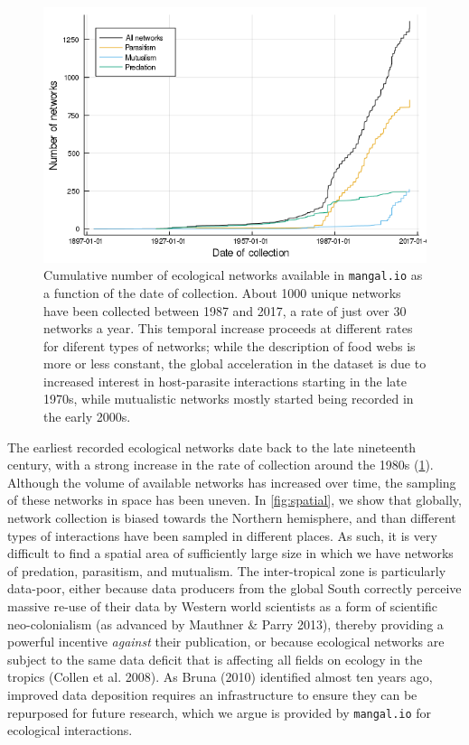 \begin{figure}
\hypertarget{fig:temporal}{%
\centering
\includegraphics{figures/figure_01_a.png}
\caption{Cumulative number of ecological networks available in
\texttt{mangal.io} as a function of the date of collection. About 1000
unique networks have been collected between 1987 and 2017, a rate of
just over 30 networks a year. This temporal increase proceeds at
different rates for diferent types of networks; while the description of
food webs is more or less constant, the global acceleration in the
dataset is due to increased interest in host-parasite interactions
starting in the late 1970s, while mutualistic networks mostly started
being recorded in the early 2000s.}\label{fig:temporal}
}
\end{figure}

The earliest recorded ecological networks date back to the late
nineteenth century, with a strong increase in the rate of collection
around the 1980s (\cref{fig:temporal}). Although the volume of available
networks has increased over time, the sampling of these networks in
space has been uneven. In \cref{fig:spatial}, we show that globally,
network collection is biased towards the Northern hemisphere, and than
different types of interactions have been sampled in different places.
As such, it is very difficult to find a spatial area of sufficiently
large size in which we have networks of predation, parasitism, and
mutualism. The inter-tropical zone is particularly data-poor, either
because data producers from the global South correctly perceive massive
re-use of their data by Western world scientists as a form of scientific
neo-colonialism (as advanced by Mauthner \& Parry 2013), thereby
providing a powerful incentive \emph{against} their publication, or
because ecological networks are subject to the same data deficit that is
affecting all fields on ecology in the tropics (Collen et al. 2008). As
Bruna (2010) identified almost ten years ago, improved data deposition
requires an infrastructure to ensure they can be repurposed for future
research, which we argue is provided by \texttt{mangal.io} for
ecological interactions.


